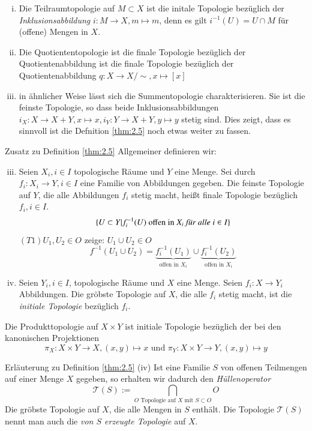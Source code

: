\documentclass[a4paper,10pt]{scrartcl}
\begin{document}
\begin{exs*}
\begin{enumerate}[(i)]
\item Die Teilraumtopologie auf $M\subset X$ ist die initale Topologie bezüglich der \emph{Inklusionsabbildung} $ i:M\to X,m\mapsto m $, denn es gilt $ i^{-1}(U)=U\cap M $ für (offene) Mengen in $ X $.
\item Die Quotiententopologie ist die finale Topologie bezüglich der Quotientenabbildung ist die finale Topologie bezüglich der Quotientenabbildung $ q: X\to X/\sim, x\mapsto [x] $
\item in ähnlicher Weise lässt sich die Summentopologie charakterisieren.  Sie ist die feinste Topologie, so dass beide Inklusionsabbildungen
$ i_X:X\to X+Y, x \mapsto x, i_Y: Y\to X+Y,y\mapsto y $ stetig sind.  Dies zeigt, dass es sinnvoll ist die Defnition \ref{thm:2.5} noch etwas weiter zu fassen.
\end{enumerate}
\end{exs*}
\begin{seg}{Zusatz zu Definition \ref{thm:2.5}}\label{thm:2.5(2)}
Allgemeiner definieren wir:
\begin{enumerate}[(i)]
\setcounter{enumi}{2}
\item Seien $X_i, i\in I$ topologische Räume und $ Y $ eine Menge. Sei durch $f_i:X_i\to Y, i\in I$ eine Familie von Abbildungen gegeben. Die feinste Topologie auf $ Y $, die alle Abbildungen $f_i$ stetig macht, heißt finale Topologie bezüglich $ f_i,i\in I $.
\[
\{U\subset Y|f^{-1}_i(U) \text{ offen in }X_i \text{ \emph{für alle} } i\in I\}
\]
$(T1) U_1, U_2\in O$ zeige: $U_1\cup U_2\in O$
\[f^{-1}(U_1\cup U_2)=\underbrace{f^{-1}_i(U_1)}_{\text{offen in } X_i}\cup \underbrace{f^{-1}_i(U_2)}_{\text{offen in } X_i}\]
\item Seien $ Y_i, i\in I $, topologische Räume und $ X $ eine Menge.  Seien $ f_i: X\to Y_i $ Abbildungen.  Die gröbste Topologie auf $ X $, die alle $f_i$ stetig macht, ist die \emph{initiale Topologie} bezüglich $f_i$. 
\end{enumerate}
\end{seg}
\begin{ex*}
Die Produkttopologie auf $ X\times Y $ ist initiale Topologie bezüglich der bei den kanonischen Projektionen
\[
\pi_X:X\times Y \to X, (x,y)\mapsto x \text{ und } \pi_Y: X\times Y\to Y, (x,y)\mapsto y 
\]
\end{ex*}
\begin{seg}{Erläuterung zu Definition \ref{thm:2.5} (iv)} 
Ist eine Familie $ S $ von offenen Teilmengen auf einer Menge $ X $ gegeben, so erhalten wir dadurch den \emph{Hüllenoperator} 
\[ 
\mathcal T(S):=\bigcap\limits_{ O \text{ Topologie auf } X \text{ mit } S\subset O} O 
\]
Die gröbste Topologie auf $ X $, die alle Mengen in $ S $ enthält. Die Topologie $ \mathcal T(S) $ nennt man auch die \emph{von $ S $ erzeugte Topologie} auf $ X $.
\end{seg}
\end{document}
